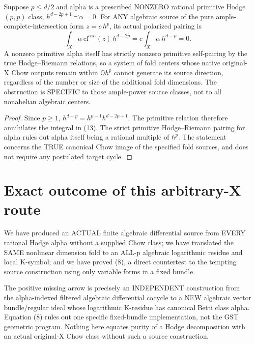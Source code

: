 \documentclass[11pt]{article}
\begin{document}
\begin{corollary}
Suppose $p\le d/2$ and alpha is
a prescribed NONZERO rational primitive
Hodge $(p,p)$ class,
$h^{d-2p+1}\smile\alpha=0$.
For ANY algebraic source of the pure
ample-complete-intersection
form $z=c\,h^p$,
its actual polarized pairing is
\[
 \boxed{
 \int_X \alpha\,\mathrm{cl}^{can}(z)\,
         h^{d-2p}
     =c\int_X\alpha\,h^{d-p}=0.
 }                                                     \tag{13}
\]
A nonzero primitive alpha itself has
strictly nonzero primitive self-pairing
by the true Hodge--Riemann relations,
so a system of fold centers whose
native original-X Chow outputs
remain within $\mathbb Q h^p$
cannot generate its source direction,
regardless of the number or size
of the additional fold dimensions.
The obstruction is SPECIFIC to those
ample-power source classes, not to
all nonabelian algebraic centers.
\end{corollary}
\begin{proof}
Since $p\ge1$,
$h^{d-p}=h^{p-1}h^{d-2p+1}$.
The primitive relation therefore
annihilates the integral in (13).
The strict primitive Hodge--Riemann
pairing for alpha rules out
alpha itself being a rational
multiple of $h^p$.
The statement concerns the TRUE
canonical Chow image of the
specified fold sources, and does
not require any postulated
target cycle.
\end{proof}

\section{Exact outcome of this arbitrary-X route}
We have produced an ACTUAL finite algebraic
differential source from EVERY rational
Hodge alpha without a supplied Chow class;
we have translated the SAME nonlinear
dimension fold to an ALL-p algebraic
logarithmic residue and local K-symbol;
and we have proved (8), a direct
countertest to the tempting source
construction using only variable
forms in a fixed bundle.

The positive missing arrow is precisely
an INDEPENDENT construction from the
alpha-indexed filtered algebraic
differential cocycle to a NEW
algebraic vector bundle/regular ideal
whose logarithmic K-residue has
canonical Betti class alpha.
Equation (8) rules out one
specific fixed-bundle implementation,
not the GST geometric program.
Nothing here equates purity
of a Hodge decomposition with an
actual original-X Chow class
without such a source construction.
\end{document}
